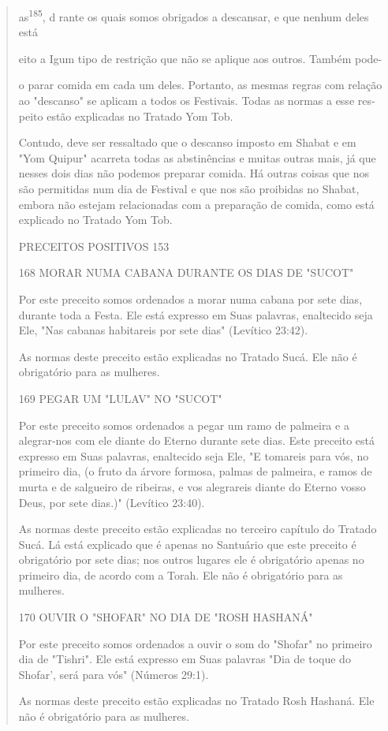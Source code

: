 \begin{quote}
as\textsuperscript{185}, d rante os quais somos obrigados a descansar, e
que nenhum deles está

eito a Igum tipo de restrição que não se aplique aos outros. Também
pode-

o parar comida em cada um deles. Portanto, as mesmas regras com rela­ção
ao "descanso" se aplicam a todos os Festivais. Todas as normas a esse
res­peito estão explicadas no Tratado Yom Tob.

Contudo, deve ser ressaltado que o descanso imposto em Shabat e em "Yom
Quipur" acarreta todas as abstinências e muitas outras mais, já que
nesses dois dias não podemos preparar comida. Há outras coisas que nos
são permitidas num dia de Festival e que nos são proibidas no Shabat,
embora não estejam rela­cionadas com a preparação de comida, como está
explicado no Tratado Yom Tob.

PRECEITOS POSITIVOS 153

168 MORAR NUMA CABANA DURANTE OS DIAS DE "SUCOT"

Por este preceito somos ordenados a morar numa cabana por sete dias,
durante toda a Festa. Ele está expresso em Suas palavras, enaltecido
seja Ele, "Nas cabanas habitareis por sete dias" (Levítico 23:42).

As normas deste preceito estão explicadas no Tratado Sucá. Ele não é
obrigatório para as mulheres.

169 PEGAR UM "LULAV" NO "SUCOT"

Por este preceito somos ordenados a pegar um ramo de palmeira e a
alegrar-nos com ele diante do Eterno durante sete dias. Este preceito
está ex­presso em Suas palavras, enaltecido seja Ele, "E tomareis para
vós, no primeiro dia, (o fruto da árvore formosa, palmas de palmeira, e
ramos de murta e de sal­gueiro de ribeiras, e vos alegrareis diante do
Eterno vosso Deus, por sete dias.)" (Levítico 23:40).

As normas deste preceito estão explicadas no terceiro capítulo do
Tratado Sucá. Lá está explicado que é apenas no Santuário que este
preceito é obrigatório por sete dias; nos outros lugares ele é
obrigatório apenas no pri­meiro dia, de acordo com a Torah. Ele não é
obrigatório para as mulheres.

170 OUVIR O "SHOFAR" NO DIA DE "ROSH HASHANÁ"

Por este preceito somos ordenados a ouvir o som do "Shofar" no primeiro
dia de "Tishri". Ele está expresso em Suas palavras "Dia de toque do
Shofar', será para vós" (Números 29:1).

As normas deste preceito estão explicadas no Tratado Rosh Hasha­ná. Ele
não é obrigatório para as mulheres.
\end{quote}

